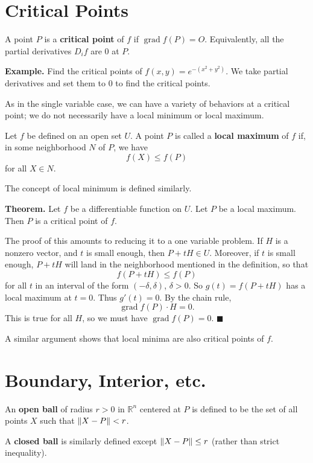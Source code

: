 \documentclass{article}
\DeclareMathOperator{\grd}{grad}
\begin{document}
\section*{Critical Points}

A point $P$ is a \textbf{critical point} of $f$ if $\grd f (P) = O$. 
Equivalently, all the partial derivatives $D_i f$ are $0$ at $P$.

\textbf{Example.} 
Find the critical points of $f(x,y) = e^{-(x^2+y^2)}$. We take 
partial derivatives and set them to $0$ to find the critical points.

As in the single variable case, we can have a variety of 
behaviors at a critical point; we do not necessarily have
a local minimum or local maximum.

Let $f$ be defined on an open set $U$. A point $P$ is called a
\textbf{local maximum} of $f$ if, in some
neighborhood $N$ of $P$, we have 
\[f(X) \leq f(P)\]
for all $X \in N$.

The concept of local minimum is defined similarly. 

\textbf{Theorem.} Let $f$ be a differentiable function on $U$.
Let $P$ be a local maximum. Then $P$ is a critical point of $f$.

The proof of this amounts to reducing it to a one variable problem.
If $H$ is a nonzero vector, and $t$ is small enough, then 
$P + tH \in U$. Moreover, if $t$ is small enough, $P+tH$ will land
in the neighborhood mentioned in the definition, so that
\[f(P+tH) \leq f(P)\]
for all $t$ in an interval of the form $(-\delta, \delta)$, $\delta > 0$.
So $g(t) = f(P+tH)$ has a local maximum at $t=0$. Thus $g'(t)=0$. 
By the chain rule, 
\[\grd f (P) \cdot H = 0.\]
This is true for all $H$, so we must have $\grd f (P) = 0$. $\blacksquare$

A similar argument shows that local minima are also critical points 
of $f$.

\section*{Boundary, Interior, etc.}

An \textbf{open ball} of radius $r>0$ in $\mathbb{R}^n$ centered at $P$ is defined to be 
the set of all points $X$ such that $\norm{X-P} < r$. 


A \textbf{closed ball} is similarly defined except $\norm{X-P} \leq r$ (rather than strict inequality).
\end{document}
